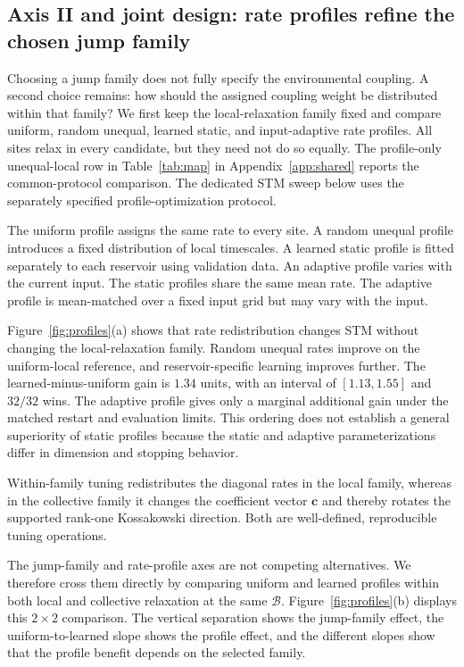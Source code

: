 \subsection{Axis II and joint design: rate profiles refine the chosen
jump family}
\label{sec:profiles}

Choosing a jump family does not fully specify the environmental coupling. A
second choice remains: how should the assigned coupling weight be distributed
within that family? We first keep the local-relaxation family
fixed and compare uniform, random unequal, learned static, and input-adaptive
rate profiles. All sites relax in every candidate, but they need not do so
equally. The profile-only unequal-local row in Table~\ref{tab:map} in
Appendix~\ref{app:shared} reports the common-protocol comparison. The dedicated STM
sweep below uses the separately
specified profile-optimization protocol.

The uniform profile assigns the same rate to every site. A random unequal
profile introduces a fixed distribution of local timescales. A learned static
profile is fitted separately to each reservoir using validation data. An
adaptive profile varies with the current input. The static profiles share the
same mean rate. The adaptive profile is mean-matched over a fixed input grid
but may vary with the input.

Figure~\ref{fig:profiles}(a) shows that rate redistribution changes STM without
changing the local-relaxation family. Random unequal rates improve on the
uniform-local reference, and reservoir-specific learning improves further.
The learned-minus-uniform gain is \(1.34\) units, with an interval of
\([1.13,1.55]\) and \(32/32\) wins. The adaptive profile gives only a marginal
additional gain under the matched restart and evaluation limits. This ordering
does not establish a general superiority of static profiles because the static
and adaptive parameterizations differ in dimension and stopping behavior.

Within-family tuning redistributes the diagonal rates in the local family,
whereas in the collective family it changes the coefficient vector
\(\boldsymbol c\) and thereby rotates the supported rank-one Kossakowski
direction. Both are well-defined, reproducible tuning operations.

The jump-family and rate-profile axes are not competing alternatives. We therefore
cross them directly by comparing uniform and learned profiles within both
local and collective relaxation at the same \(\mathcal B\).
Figure~\ref{fig:profiles}(b) displays this \(2\times2\) comparison. The vertical
separation shows the jump-family effect, the uniform-to-learned slope shows the
profile effect, and the different slopes show that the profile benefit depends
on the selected family.


